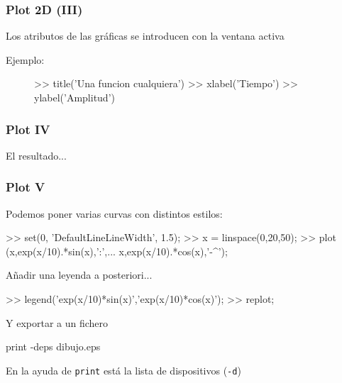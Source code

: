 \begin{frame}[containsverbatim]
\frametitle{Plot 2D (III)}

Los atributos de las gráficas se introducen con la ventana activa
\begin{description}
\item [Ejemplo:]

\begin{Octave}
>> title('Una funcion cualquiera') 
>> xlabel('Tiempo') 
>> ylabel('Amplitud')
\end{Octave}

\end{description}

\end{frame}



\hypertarget{plot-iv}{}
\begin{frame}\frametitle{Plot IV}

El resultado...
\begin{figure}[htbp]\begin{center}

\end{center}\end{figure}

\end{frame}


\hypertarget{plot-v}{}
\begin{frame}[containsverbatim]
\frametitle{Plot V}
\small
Podemos poner varias curvas con distintos estilos:
\begin{Octave}
>> set(0, 'DefaultLineLineWidth', 1.5);   %
>> x = linspace(0,20,50);
>> plot (x,exp(x/10).*sin(x),':',...
         x,exp(x/10).*cos(x),'-^'); 
\end{Octave}

Añadir una leyenda a posteriori...
\begin{Octave}
>> legend('exp(x/10)*sin(x)','exp(x/10)*cos(x)');
>> replot;  %
\end{Octave}

Y exportar a un fichero
\begin{Octave}
  print -deps dibujo.eps
\end{Octave}

En la ayuda de \verb|print| está la lista de dispositivos (\verb|-d|)
\end{frame}

